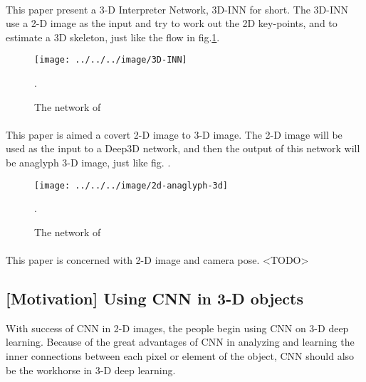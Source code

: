 \documentclass[border=0.5in]{blog}
\begin{document}
    \paragraph{\citep{DBLP:journals/corr/0001XLTTTF16}}
    
    This paper present a 3-D Interpreter Network, 3D-INN for short.
    The 3D-INN use a 2-D image as the input and try to work out the 2D key-points,
    and to estimate a 3D skeleton, just like the flow in fig.\ref{fig:3d-inn}.
    
    \begin{figure}
        \centering
        \texttt{[image: ../../../image/3D-INN]}
        \caption{The network of \citep{DBLP:journals/corr/0001XLTTTF16}}.
        \label{fig:3d-inn}
    \end{figure}
    
    
    \paragraph{\citep{DBLP:journals/corr/XieGF16}}
    This paper is aimed a covert 2-D image to 3-D image.
    The 2-D image will be used as the input to a Deep3D network, and then
    the output of this network will be anaglyph 3-D image, just like fig. .
    
    \begin{figure}
        \centering
        \texttt{[image: ../../../image/2d-anaglyph-3d]}
        \caption{The network of \citep{DBLP:journals/corr/XieGF16}}.
        \label{fig:2d-anaglyph-3d}
    \end{figure}
    
    \paragraph{\citep{DBLP:journals/corr/abs-1710-08247}}
    
    This paper is concerned with 2-D image and camera pose.
    <TODO>
    
    
    \subsection{[Motivation] Using CNN in 3-D objects}
    \label{sec:rbm:usingcnn3d}
    
    With success of CNN in 2-D images, the people begin using CNN on 3-D deep learning.
    Because of the great advantages of CNN in analyzing and learning the inner
    connections between each pixel or element of the object, CNN should also be
    the workhorse in 3-D deep learning.
    
\end{document}
